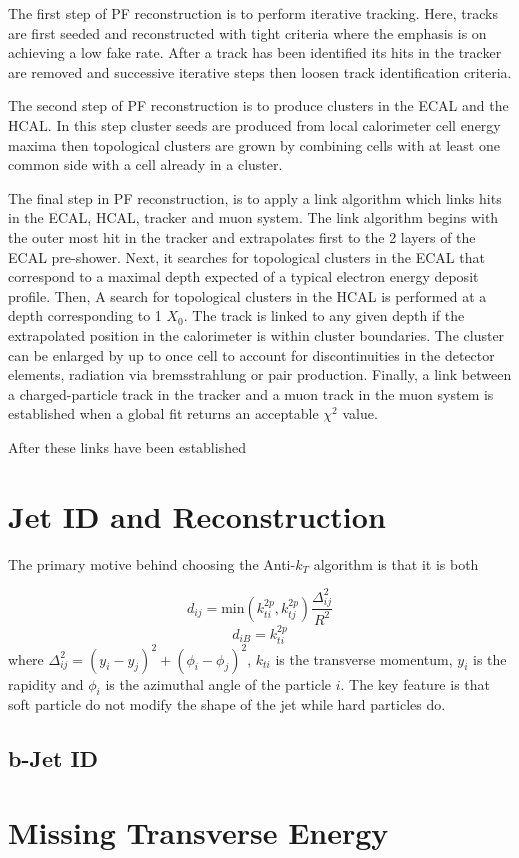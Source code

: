 The first step of PF reconstruction is to perform
iterative tracking. Here, tracks are first seeded and reconstructed with tight criteria
where the emphasis is on achieving a low fake rate. 
After a track has been identified its hits in the tracker are removed and successive iterative steps
then loosen track identification criteria.

The second step of PF reconstruction is to produce clusters in the ECAL and the HCAL. 
In this step cluster seeds are produced from local calorimeter cell energy maxima
then topological clusters are grown by combining cells with at least one common side
with a cell already in a cluster. 

The final step in PF reconstruction, is to apply a link algorithm which links
hits in the ECAL, HCAL, tracker and muon system. The link algorithm
begins with the outer most hit in the tracker and extrapolates
first to the 2 layers of the ECAL pre-shower. Next, it searches for topological clusters
in the ECAL that correspond to a maximal depth expected of a typical
electron energy deposit profile. Then, A search for topological clusters in the
HCAL is performed at a depth corresponding to 1 $X_{0}$.
The track is linked to any given depth if the extrapolated position in 
the calorimeter is within cluster boundaries. The cluster can be enlarged by up 
to once cell to account for discontinuities in the detector elements, radiation via
bremsstrahlung or pair production. Finally, a link between a charged-particle
track in the tracker and a muon track in the muon system is established
when a global fit returns an acceptable $\chi^{2}$ value.

After these links have been established
\section{Jet ID and Reconstruction}
The primary motive behind choosing the Anti-$k_{T}$ algorithm is that it is both

\begin{equation}
d_{ij}=\mathrm{min}(k_{ti}^{2p},k_{tj}^{2p})\frac{\Delta^{2}_{ij}}{R^{2}}
\end{equation}
\begin{equation}
d_{iB}=k_{ti}^{2p}
\end{equation}
where $\Delta_{ij}^{2}=(y_{i}-y_{j})^{2}+(\phi_{i}-\phi_{j})^{2}$, $k_{ti}$ is the 
transverse momentum, $y_{i}$ is the rapidity and $\phi_{i}$ is the azimuthal angle of 
the particle $i$.
The key feature is that soft particle do not modify the shape of the jet while hard particles do.


\subsection{b-Jet ID}
\section{Missing Transverse Energy}

